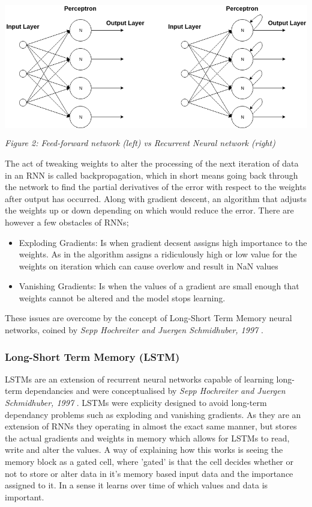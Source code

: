 \documentclass[oneside, 12pt]{article}
\begin{document}
			\begin{center}
				\includegraphics[width=15cm,height=6cm]{images/rnn_ffn.png}
				\newline
				\textit{Figure 2: Feed-forward network (left) vs Recurrent Neural network (right)}
			\end{center}
		
			The act of tweaking weights to alter the processing of the next iteration of data in an RNN is called backpropagation, which in short means going back through the network to find the partial derivatives of the error with respect to the weights after output has occurred. Along with gradient descent, an algorithm that adjusts the weights up or down depending on which would reduce the error. There are however a few obstacles of RNNs;
			
			\begin{itemize}
				\item Exploding Gradients: Is when gradient decsent assigns high importance to the weights. As in the algorithm assigns a ridiculously high or low value for the weights on iteration which can cause overlow and result in NaN values \cite{NNEgrad}
				\item Vanishing Gradients: Is when the values of a gradient are small enough that weights cannot be altered and the model stops learning. \cite{RNNvanishGrad}
			\end{itemize}
		
			These issues are overcome by the concept of Long-Short Term Memory neural networks, coined by \textit{Sepp Hochreiter and Juergen Schmidhuber, 1997} \cite{LSTM}. 
			
			\subsubsection{Long-Short Term Memory (LSTM)}\label{lstms}
			LSTMs are an extension of recurrent neural networks capable of learning long-term dependancies and were conceptualised by \textit{Sepp Hochreiter and Juergen Schmidhuber, 1997} \cite{LSTM}. LSTMs were explicity designed to avoid long-term dependancy problems such as exploding and vanishing gradients. As they are an extension of RNNs they operating in almost the exact same manner, but stores the actual gradients and weights in memory which allows for LSTMs to read, write and alter the values. A way of explaining how this works is seeing the memory block as a gated cell, where 'gated' is that the cell decides whether or not to store or alter data in it's memory based input data and the importance assigned to it. In a sense it learns over time of which values and data is important.
			
\end{document}
